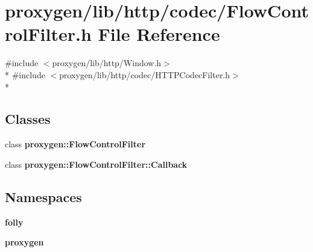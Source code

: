 \section{proxygen/lib/http/codec/\+Flow\+Control\+Filter.h File Reference}
\label{FlowControlFilter_8h}
{\ttfamily \#include $<$proxygen/lib/http/\+Window.\+h$>$}\\*
{\ttfamily \#include $<$proxygen/lib/http/codec/\+H\+T\+T\+P\+Codec\+Filter.\+h$>$}\\*
\subsection*{Classes}
\begin{DoxyCompactItemize}
\item 
class {\bf proxygen\+::\+Flow\+Control\+Filter}
\item 
class {\bf proxygen\+::\+Flow\+Control\+Filter\+::\+Callback}
\end{DoxyCompactItemize}
\subsection*{Namespaces}
\begin{DoxyCompactItemize}
\item 
 {\bf folly}
\item 
 {\bf proxygen}
\end{DoxyCompactItemize}
